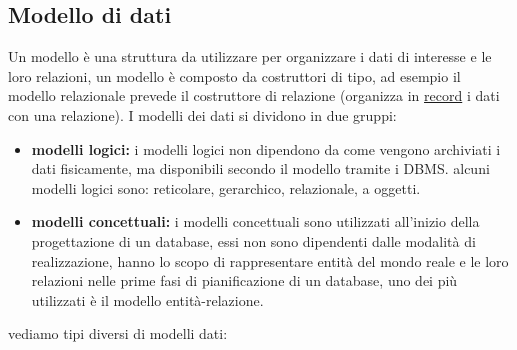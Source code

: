\documentclass{article}
\begin{document}
    \subsection{Modello di dati}
        Un modello è una struttura da utilizzare per organizzare i dati di interesse e le loro relazioni, un modello è composto da costruttori di tipo, ad esempio il modello relazionale prevede il costruttore di relazione (organizza in \hyperref[word:record]{record} i dati con una relazione). I modelli dei dati si dividono in due gruppi:
        \begin{itemize}
            \item \textbf{modelli logici:}
            i modelli logici non dipendono da come vengono archiviati i dati fisicamente, ma disponibili secondo il modello tramite i DBMS.
            alcuni modelli logici sono: reticolare, gerarchico, relazionale, a oggetti.
            
            \item \textbf{modelli concettuali:}
            i modelli concettuali sono utilizzati all'inizio della progettazione di un database, essi non sono dipendenti dalle modalità di realizzazione, hanno lo scopo di rappresentare entità del mondo reale e le loro relazioni nelle prime fasi di pianificazione di un database, uno dei più utilizzati è il modello entità-relazione.
        \end{itemize}
        vediamo tipi diversi di modelli dati:
\end{document}
